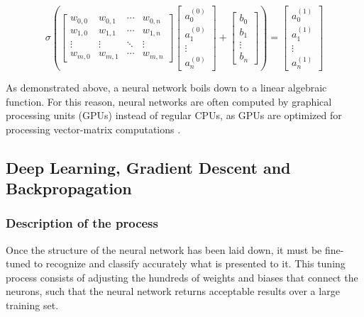 ﻿\documentclass[12pt,a4paper,notitlepage]{article}
\begin{document}
\begin{displaymath}
 \sigma
 \left(
 \begin{bmatrix}
  w_{0,0} & w_{0,1} & \cdots & w_{0,n}\\
  w_{1,0} & w_{1,1} & \cdots & w_{1,n}\\
  \vdots & \vdots & \ddots & \vdots\\
  w_{m,0} & w_{m,1} & \cdots & w_{m,n}
 \end{bmatrix}
 \begin{bmatrix}
  a_{0}^{(0)}\\
  a_{1}^{(0)}\\
  \vdots\\
  a_{n}^{(0)}
 \end{bmatrix}
 +
 \begin{bmatrix}
  b_{0}\\
  b_{1}\\
  \vdots\\
  b_{n}
 \end{bmatrix}
 \right)
 =
 \begin{bmatrix}
  a_{0}^{(1)}\\
  a_{1}^{(1)}\\
  \vdots\\
  a_{n}^{(1)}
 \end{bmatrix}
\end{displaymath}

As demonstrated above, a neural network boils down to a linear algebraic function. For this reason, neural networks are often computed by graphical processing units (GPUs) instead of regular CPUs, as GPUs are optimized for processing vector-matrix computations \cite{salter_cart_2021}.

\subsection{Deep Learning, Gradient Descent and Backpropagation}\label{deep-learning}

\subsubsection{Description of the process}
Once the structure of the neural network has been laid down, it must be fine-tuned to recognize and classify accurately what is presented to it. This tuning process consists of adjusting the hundreds of weights and biases that connect the neurons, such that the neural network returns acceptable results over a large training set. 
\end{document}

